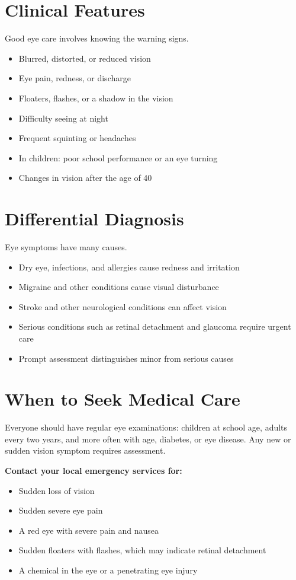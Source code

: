 \section*{Clinical Features}
Good eye care involves knowing the warning signs.
\begin{itemize}
    \item Blurred, distorted, or reduced vision
    \item Eye pain, redness, or discharge
    \item Floaters, flashes, or a shadow in the vision
    \item Difficulty seeing at night
    \item Frequent squinting or headaches
    \item In children: poor school performance or an eye turning
    \item Changes in vision after the age of 40
\end{itemize}

\section*{Differential Diagnosis}
Eye symptoms have many causes.
\begin{itemize}
    \item Dry eye, infections, and allergies cause redness and irritation
    \item Migraine and other conditions cause visual disturbance
    \item Stroke and other neurological conditions can affect vision
    \item Serious conditions such as retinal detachment and glaucoma require urgent care
    \item Prompt assessment distinguishes minor from serious causes
\end{itemize}

\section*{When to Seek Medical Care}
Everyone should have regular eye examinations: children at school age, adults every two years, and more often with age, diabetes, or eye disease. Any new or sudden vision symptom requires assessment.

\textbf{Contact your local emergency services for:}
\begin{itemize}
    \item Sudden loss of vision
    \item Sudden severe eye pain
    \item A red eye with severe pain and nausea
    \item Sudden floaters with flashes, which may indicate retinal detachment
    \item A chemical in the eye or a penetrating eye injury
\end{itemize}

